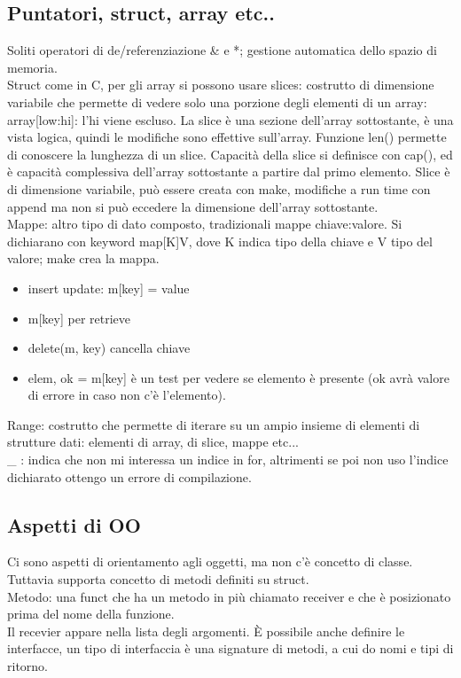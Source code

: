 \documentclass[16px]{article}
\begin{document}
\subsection{Puntatori, struct, array etc..}
Soliti operatori di de/referenziazione \& e *; gestione automatica dello spazio di memoria.\\ Struct come in C, per gli array si possono usare slices: costrutto di dimensione variabile che permette di vedere solo una porzione degli elementi di un array: array[low:hi]: l'hi viene escluso. La slice è una sezione dell'array sottostante, è una vista logica, quindi le modifiche sono effettive sull'array. Funzione len() permette di conoscere la lunghezza di un slice. Capacità della slice si definisce con cap(), ed è capacità complessiva dell'array sottostante a partire dal primo elemento. Slice è di dimensione variabile, può essere creata con make, modifiche a run time con append ma non si può eccedere la dimensione dell'array sottostante.\\Mappe: altro tipo di dato composto, tradizionali mappe chiave:valore. Si dichiarano con keyword map[K]V, dove K indica tipo della chiave e V tipo del valore; make crea la mappa.\\ 
\begin{itemize}
\item insert update: m[key] = value
\item m[key] per retrieve
\item delete(m, key) cancella chiave
\item elem, ok = m[key] è un test per vedere se elemento è presente (ok avrà valore di errore in caso non c'è l'elemento).
\end{itemize}
Range: costrutto che permette di iterare su un ampio insieme di elementi di strutture dati: elementi di array, di slice, mappe etc... \\ \_ : indica che non mi interessa un indice in for, altrimenti se poi non uso l'indice dichiarato ottengo un errore di compilazione.
\subsection{Aspetti di OO}
Ci sono aspetti di orientamento agli oggetti, ma non c'è concetto di classe. Tuttavia supporta concetto di metodi definiti su struct.\\ Metodo: una funct che ha un metodo in più chiamato receiver e che è posizionato prima del nome della funzione.\\ Il recevier appare nella lista degli argomenti. È possibile anche definire le interfacce, un tipo di interfaccia è una signature di metodi, a cui do nomi e tipi di ritorno.
\end{document}
